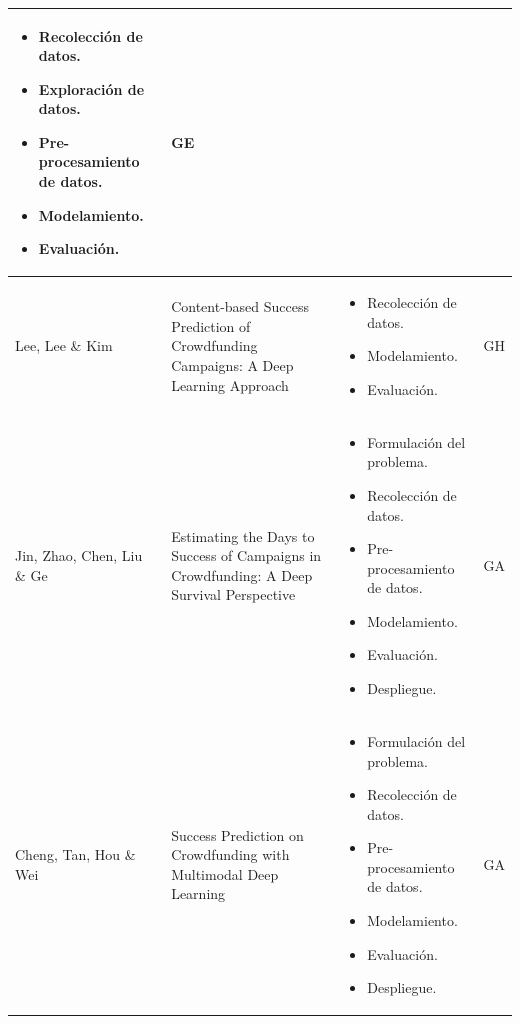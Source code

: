 \begin{longtable}{M{3cm}M{5.5cm}M{5.5cm}M{1.5cm}}
\begin{itemize}[label={--},nosep,noitemsep,leftmargin=*,topsep=0pt,partopsep=0pt]
				\item Recolección de datos.
				\item Exploración de datos.
				\item Pre-procesamiento de datos.
				\item Modelamiento.
				\item Evaluación.
			\end{itemize}
			& GE
			\\
			\hline
			Lee, Lee \& Kim
			& Content-based Success Prediction of Crowdfunding Campaigns: A Deep Learning Approach
			& 
			\begin{itemize}[label={--},nosep,noitemsep,leftmargin=*,topsep=0pt,partopsep=0pt]
				\item Recolección de datos.
				\item Modelamiento.
				\item Evaluación.
			\end{itemize}
			& GH
			\\
			\hline
			Jin, Zhao, Chen, Liu \& Ge
			& Estimating the Days to Success of Campaigns in Crowdfunding: A Deep Survival Perspective
			& 
			\begin{itemize}[label={--},nosep,noitemsep,leftmargin=*,topsep=0pt,partopsep=0pt]
				\item Formulación del problema.
				\item Recolección de datos.
				\item Pre-procesamiento de datos.
				\item Modelamiento.
				\item Evaluación.
				\item Despliegue.
			\end{itemize}
			& GA
			\\
			\hline
			Cheng, Tan, Hou \& Wei
			& Success Prediction on Crowdfunding with Multimodal Deep Learning
			& 
			\begin{itemize}[label={--},nosep,noitemsep,leftmargin=*,topsep=0pt,partopsep=0pt]
				\item Formulación del problema.
				\item Recolección de datos.
				\item Pre-procesamiento de datos.
				\item Modelamiento.
				\item Evaluación.
				\item Despliegue.
			\end{itemize}
			& GA
			\\

\end{longtable}
